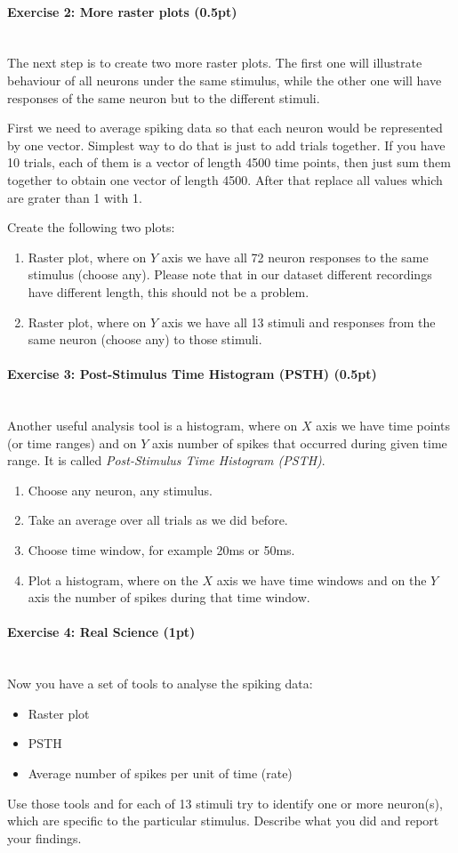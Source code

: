 \documentclass[a4paper,11pt]{article}
\newenvironment{exercise}[3]{\paragraph{Exercise #1: #2 (#3pt)}\ \\}{
\medskip}
\begin{document}
\begin{exercise}{2}{More raster plots}{0.5}
The next step is to create two more raster plots. The first one will illustrate behaviour of all neurons under the same stimulus, while the other one will have responses of the same neuron but to the different stimuli.

First we need to average spiking data so that each neuron would be represented by one vector. Simplest way to do that is just to add trials together. If you have 10 trials, each of them is a vector of length 4500 time points, then just sum them together to obtain one vector of length 4500. After that replace all values which are grater than 1 with 1.

Create the following two plots:
\begin{enumerate}
	\item Raster plot, where on $Y$ axis we have all 72 neuron responses to the same stimulus (choose any). Please note that in our dataset different recordings have different length, this should not be a problem.
	\item Raster plot, where on $Y$ axis we have all 13 stimuli and responses from the same neuron (choose any) to those stimuli.
\end{enumerate}


\end{exercise}

\begin{exercise}{3}{Post-Stimulus Time Histogram (PSTH)}{0.5}
Another useful analysis tool is a histogram, where on $X$ axis we have time points (or time ranges) and on $Y$ axis number of spikes that occurred during given time range. It is called \emph{Post-Stimulus Time Histogram (PSTH)}.
\begin{enumerate}
	\item Choose any neuron, any stimulus.
	\item Take an average over all trials as we did before.
	\item Choose time window, for example 20ms or 50ms.
	\item Plot a histogram, where on the $X$ axis we have time windows and on the $Y$ axis the number of spikes during that time window.
\end{enumerate}
\end{exercise}


\begin{exercise}{4}{Real Science}{1}
Now you have a set of tools to analyse the spiking data:
\begin{itemize}
	\item Raster plot
	\item PSTH
	\item Average number of spikes per unit of time (rate)
\end{itemize}
Use those tools and for each of 13 stimuli try to identify one or more neuron(s), which are specific to the particular stimulus. Describe what you did and report your findings.
\end{exercise}
\end{document}
